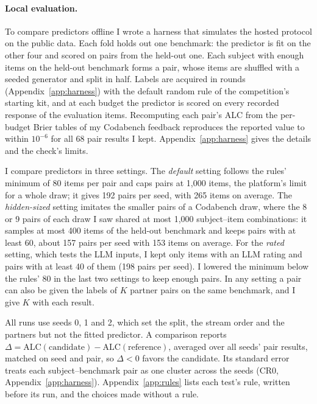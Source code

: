 \begin{table}[h]
  \caption{Public training data after the binary-scale filter. Responses include repeated trials; mean label is the share equal to 1. Pairs: pairs with 80 to 1,000 items (default setting, per seed). Rated items: items with an LLM rating (1,379 items share 1,049 ratings; on MathArena, 696 items cover 366 problems). Rated pairs: pairs with at least 40 rated items (rated setting, per seed). The total row counts distinct subjects.}
  \label{tab:data}
  \centering
  \small
  \setlength{\tabcolsep}{4pt}
  
\end{table}

\paragraph{Local evaluation.}
To compare predictors offline I wrote a harness that simulates the hosted protocol on the public data. Each fold holds out one benchmark: the predictor is fit on the other four and scored on pairs from the held-out one. Each subject with enough items on the held-out benchmark forms a pair, whose items are shuffled with a seeded generator and split in half. Labels are acquired in rounds (Appendix~\ref{app:harness}) with the default random rule of the competition's starting kit, and at each budget the predictor is scored on every recorded response of the evaluation items. Recomputing each pair's ALC from the per-budget Brier tables of my Codabench feedback reproduces the reported value to within $10^{-6}$ for all 68 pair results I kept. Appendix~\ref{app:harness} gives the details and the check's limits.

I compare predictors in three settings. The \emph{default} setting follows the rules' minimum of 80 items per pair and caps pairs at 1,000 items, the platform's limit for a whole draw; it gives 192 pairs per seed, with 265 items on average. The \emph{hidden-sized} setting imitates the smaller pairs of a Codabench draw, where the 8 or 9 pairs of each draw I saw shared at most 1,000 subject--item combinations: it samples at most 400 items of the held-out benchmark and keeps pairs with at least 60, about 157 pairs per seed with 153 items on average. For the \emph{rated} setting, which tests the LLM inputs, I kept only items with an LLM rating and pairs with at least 40 of them (198 pairs per seed). I lowered the minimum below the rules' 80 in the last two settings to keep enough pairs. In any setting a pair can also be given the labels of $K$ partner pairs on the same benchmark, and I give $K$ with each result.

All runs use seeds 0, 1 and 2, which set the split, the stream order and the partners but not the fitted predictor. A comparison reports $\Delta = \mathrm{ALC}(\text{candidate}) - \mathrm{ALC}(\text{reference})$, averaged over all seeds' pair results, matched on seed and pair, so $\Delta < 0$ favors the candidate. Its standard error treats each subject--benchmark pair as one cluster across the seeds (CR0, Appendix~\ref{app:harness}). Appendix~\ref{app:rules} lists each test's rule, written before its run, and the choices made without a rule.
